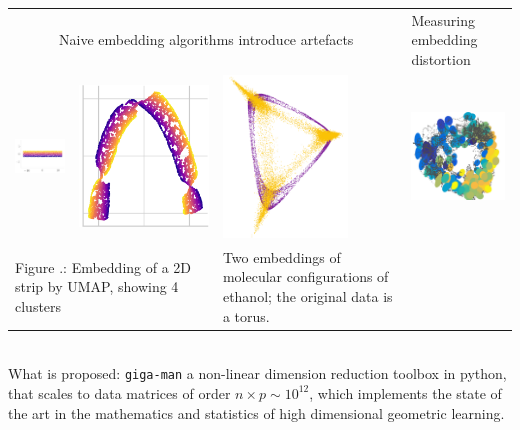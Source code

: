 \documentclass[floatfix,11pt]{revtex4-1}
\begin{document}
\begin{tabular}{llll}
\multicolumn{3}{c}{Naive embedding algorithms introduce artefacts}
&
Measuring embedding distortion
\\
\includegraphics[width=1.9in]{Figures/D1_original_data.png} &
\includegraphics[width=1.in]{Figures/umap_mindist_comp.png} &
\includegraphics[width=1.3in,angle=90]{Figures/geometric_vs_normalized.png}
&
\includegraphics[width=1.3in]{Figures/aspirin-postclu1-phi234Rmetric-tau22.png}
\\
\multicolumn{2}{l}{\parbox{3in}{Figure .: Embedding of a 2D strip by UMAP, showing 4 clusters}}
&
\parbox{2.1in}{Two embeddings of molecular configurations of ethanol; the original data is a torus.}\\
\end{tabular}
\\
What is proposed: {\tt giga-man} a non-linear dimension reduction toolbox in python, that scales to data matrices of order $n\times p \sim 10^12$, which implements the state of the art in the mathematics and statistics of high dimensional geometric learning.
\end{document}
